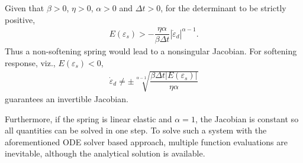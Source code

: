 Given that $\beta>0$, $\eta>0$, $\alpha>0$ and $\Delta{}t>0$, for the determinant to be strictly positive,
\begin{gather}
E(\varepsilon_s)>-\dfrac{\eta\alpha}{\beta\Delta{}t}\left\lvert\dot\varepsilon_d\right\rvert^{\alpha-1}.
\end{gather}
Thus a non-softening spring would lead to a nonsingular Jacobian. For softening response, viz., $E(\varepsilon_s)<0$,
\begin{gather}
\dot\varepsilon_d\neq\pm\sqrt[\alpha-1]{\dfrac{\beta\Delta{}t{}\left\lvert{}E(\varepsilon_s)\right\rvert}{\eta\alpha}}
\end{gather}
guarantees an invertible Jacobian.

Furthermore, if the spring is linear elastic and $\alpha=1$, the Jacobian is constant so all quantities can be solved in one step. To solve such a system with the aforementioned ODE solver based approach, multiple function evaluations are inevitable, although the analytical solution is available.
